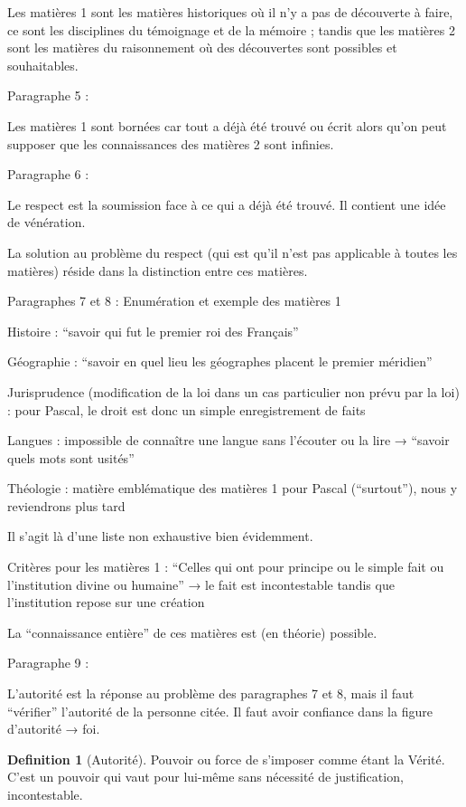 \documentclass[french]{book}
\theoremstyle{definition}
\newtheorem*{dfn}{Definition}
\begin{document}
Les matières 1 sont les matières historiques où il n’y a pas de découverte à faire, ce sont les disciplines du témoignage et de la mémoire ; tandis que les matières 2 sont les matières du raisonnement où des découvertes sont possibles et souhaitables.

Paragraphe 5 :

Les matières 1 sont bornées car tout a déjà été trouvé ou écrit alors qu’on peut supposer que les connaissances des matières 2 sont infinies.

Paragraphe 6 :

Le respect est la soumission face à ce qui a déjà été trouvé. Il contient une idée de vénération.

La solution au problème du respect (qui est qu’il n’est pas applicable à toutes les matières) réside dans la distinction entre ces matières.

Paragraphes 7 et 8 : Enumération et exemple des matières 1

Histoire : “savoir qui fut le premier roi des Français”

Géographie : “savoir en quel lieu les géographes placent le premier méridien”

Jurisprudence (modification de la loi dans un cas particulier non prévu par la loi) : pour Pascal, le droit est donc un simple enregistrement de faits

Langues : impossible de connaître une langue sans l’écouter ou la lire → “savoir quels mots sont usités”

Théologie : matière emblématique des matières 1 pour Pascal (“surtout”), nous y reviendrons plus tard

Il s’agit là d’une liste non exhaustive bien évidemment.

Critères pour les matières 1 : “Celles qui ont pour principe ou le simple fait ou l’institution divine ou humaine” → le fait est incontestable tandis que l’institution repose sur une création 

La “connaissance entière” de ces matières est (en théorie) possible.

Paragraphe 9 :

L’autorité est la réponse au problème des paragraphes 7 et 8, mais il faut “vérifier” l’autorité de la personne citée. Il faut avoir confiance dans la figure d’autorité → foi.

\begin{dfn}[Autorité]
Pouvoir ou force de s’imposer comme étant la Vérité. C'est un pouvoir qui vaut pour lui-même sans nécessité de justification, incontestable.
\end{dfn}
\end{document}
